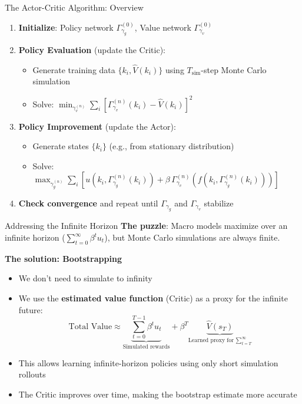 \documentclass[10pt,english,aspectratio=169]{beamer}
\begin{document}
\begin{frame}{The Actor-Critic Algorithm: Overview}
\begin{enumerate}
  \item \textbf{Initialize}: Policy network $\Gamma_{\gamma_g}^{(0)}$, Value network $\Gamma_{\gamma_v}^{(0)}$
  \medskip
  \item \textbf{Policy Evaluation} (update the Critic):
    \begin{itemize}
      \item Generate training data $\{k_i, \hat{V}(k_i)\}$ using $T_{\text{sim}}$-step Monte Carlo simulation
      \item Solve: $\min_{\gamma_v^{(n)}} \sum_i [\Gamma_{\gamma_v}^{(n)}(k_i) - \hat{V}(k_i)]^2$
    \end{itemize}
  \medskip
  \item \textbf{Policy Improvement} (update the Actor):
    \begin{itemize}
      \item Generate states $\{k_i\}$ (e.g., from stationary distribution)
      \item Solve: $\max_{\gamma_g^{(n)}} \sum_i [u(k_i, \Gamma_{\gamma_g}^{(n)}(k_i)) + \beta\, \Gamma_{\gamma_v}^{(n)}(f(k_i, \Gamma_{\gamma_g}^{(n)}(k_i)))]$
    \end{itemize}
  \medskip
  \item \textbf{Check convergence} and repeat until $\Gamma_{\gamma_g}$ and $\Gamma_{\gamma_v}$ stabilize
\end{enumerate}
\end{frame}

\begin{frame}{Addressing the Infinite Horizon}
\textbf{The puzzle}: Macro models maximize over an infinite horizon ($\sum_{t=0}^\infty \beta^t u_t$), but Monte Carlo simulations are always finite.

\vspace{0.3cm}
\textbf{The solution: Bootstrapping}
\begin{itemize}
  \item We don't need to simulate to infinity
  \item We use the \textbf{estimated value function} (Critic) as a proxy for the infinite future:
    \[
      \text{Total Value} \approx \underbrace{\sum_{t=0}^{T-1} \beta^t u_t}_{\text{Simulated rewards}} + \beta^T \underbrace{\hat{V}(s_T)}_{\text{Learned proxy for } \sum_{t=T}^\infty}
    \]
  \medskip
  \item This allows learning infinite-horizon policies using only short simulation rollouts
  \item The Critic improves over time, making the bootstrap estimate more accurate
\end{itemize}
\end{frame}
\end{document}
